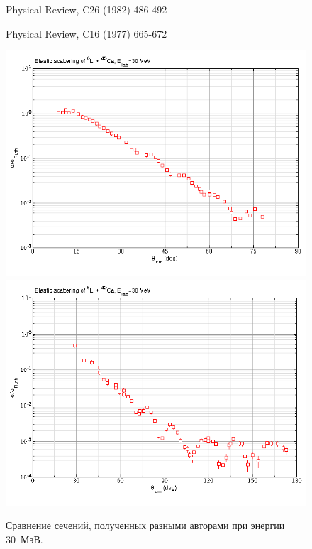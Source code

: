 \documentclass[a4paper, 12pt]{article}
\begin{document}
\begin{figure}
	\parbox{.49\linewidth}{\small\centering Physical Review, C26 (1982) 486-492}
	\parbox{.49\linewidth}{\small\centering Physical Review, C16 (1977) 665-672}
	\includegraphics[width=.49\linewidth]{figures/010-30mev-ratio.png}
	\includegraphics[width=.49\linewidth]{figures/004-30mev-ratio.png}
	\caption{Сравнение сечений, полученных разными авторами при энергии 30~МэВ.~\cite{26-28-30-34mev,30mev}}
	\label{fig:30mev-cmp}
\end{figure}%
\end{document}
